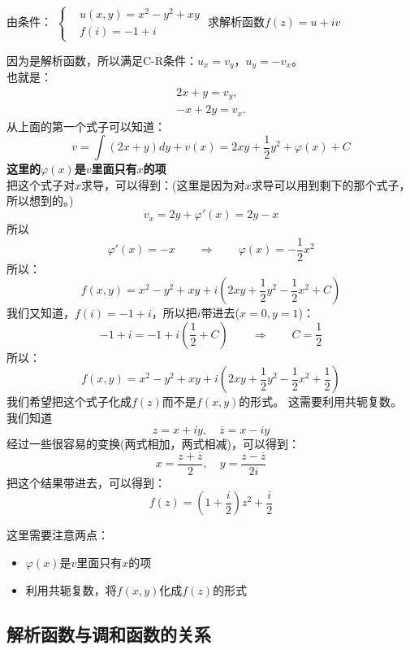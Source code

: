 \documentclass[cn,hazy,blue,14pt,normal]{elegantnote}
\numberwithin{equation}{section}
\begin{document}
\begin{example}
	由条件：
	$\left\{
	\begin{aligned}
		&u(x,y) = x^2-y^2+xy\\
		&f(i) = -1+i
		\end{aligned}
	\right.$
	求解析函数$f(z)=u+iv$
\end{example}
因为是解析函数，所以满足C-R条件：$u_x=v_y$，$u_y=-v_x$。\\
也就是：
\begin{gather*}
	2x+y=v_y,\\
	-x+2y=v_x.
\end{gather*}
从上面的第一个式子可以知道：
$$
v=\int (2x+y)dy + v(x) = 2xy+\frac{1}{2}y^2 + \varphi(x) + C
$$
\textbf{这里的$\varphi(x)$是$v$里面只有$x$的项}\\
把这个式子对$x$求导，可以得到：(这里是因为对$x$求导可以用到剩下的那个式子，所以想到的。)
$$
v_x=2y+\varphi'(x)=2y-x
$$
所以
$$
\varphi'(x)=-x\qquad\Rightarrow\qquad\varphi(x)=-\frac{1}{2}x^2
$$
所以：
$$
f(x,y)=x^2-y^2+xy+i(2xy+\frac{1}{2}y^2-\frac{1}{2}x^2+C)
$$
我们又知道，$f(i)=-1+i$，所以把$i$带进去($x=0,y=1$)：
$$
-1+i=-1+i(\frac12 + C) \qquad\Rightarrow\qquad C=\frac12
$$
所以：
$$
f(x,y)=x^2-y^2+xy+i(2xy+\frac{1}{2}y^2-\frac{1}{2}x^2+\frac12)
$$
我们希望把这个式子化成$f(z)$而不是$f(x,y)$的形式。
这需要利用共轭复数。\\
我们知道
$$
z=x+iy,\quad \overline{z}=x-iy
$$
经过一些很容易的变换(两式相加，两式相减)，可以得到：
$$
x=\frac{z+\overline{z}}{2},\quad y=\frac{z-\overline{z}}{2i}
$$
把这个结果带进去，可以得到：
$$
f(z)=(1+\frac i2)z^2+\frac i2
$$
\begin{note}
	这里需要注意两点：
	\begin{itemize}
		\item $\varphi(x)$是$v$里面只有$x$的项
		\item 利用共轭复数，将$f(x,y)$化成$f(z)$的形式
	\end{itemize}
\end{note}
\newpage
\subsection{解析函数与调和函数的关系}
\end{document}
